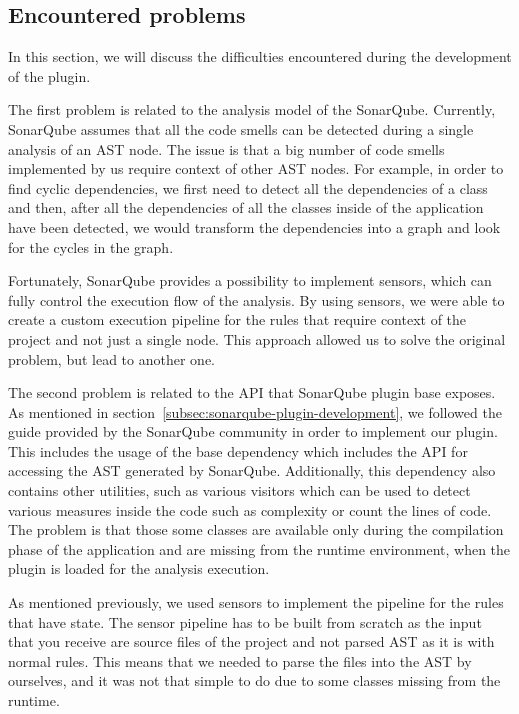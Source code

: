 \subsection{Encountered problems}\label{subsec:encountered-problems}


In this section, we will discuss the difficulties encountered during the development of the plugin.

The first problem is related to the analysis model of the SonarQube.
Currently, SonarQube assumes that all the code smells can be detected during a single
analysis of an AST node.
The issue is that a big number of code smells implemented by us require context of other AST nodes.
For example, in order to find cyclic dependencies, we first need to detect all the dependencies
of a class and then, after all the dependencies of all the classes inside of the application have been detected,
we would transform the dependencies into a graph and look for the cycles in the graph.

Fortunately, SonarQube provides a possibility to implement sensors, which can fully control the execution flow
of the analysis.
By using sensors, we were able to create a custom execution pipeline for the rules that require context of the project
and not just a single node.
This approach allowed us to solve the original problem, but lead to another one.

The second problem is related to the API that SonarQube plugin base exposes.
As mentioned in section~\ref{subsec:sonarqube-plugin-development}, we followed the guide provided by the SonarQube community in
order to implement our plugin.
This includes the usage of the base dependency which includes the API for accessing the AST generated by SonarQube.
Additionally, this dependency also contains other utilities, such as various visitors which can be used to detect
various measures inside the code such as complexity or count the lines of code.
The problem is that those some classes are available only during the compilation phase of the application and
are missing from the runtime environment, when the plugin is loaded for the analysis execution.

As mentioned previously, we used sensors to implement the pipeline for the rules that have state.
The sensor pipeline has to be built from scratch as the input that you receive are source files of the project and not
parsed AST as it is with normal rules.
This means that we needed to parse the files into the AST by ourselves, and it was not that simple to do due to some
classes missing from the runtime.

